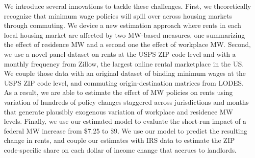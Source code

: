 We introduce several innovations to tackle these challenges.
First, we theoretically recognize that minimum wage policies will spill over across
housing markets through commuting.
We device a new estimation approach where rents in each local housing market are 
affected by two MW-based measures, one summarizing the effect of residence MW and 
a second one the effect of workplace MW.
Second, we use a novel panel dataset on rents at the USPS ZIP code level and with a
monthly frequency from Zillow, the largest online rental marketplace in the US.
We couple those data with an original dataset of binding minimum wages at the USPS
ZIP code level, and commuting origin-destination matrices from LODES.
As a result, we are able to estimate the effect of MW policies on rents using 
variation of hundreds of policy changes staggered across jurisdictions and months 
that generate plausibly exogenous variation of workplace and residence MW levels.
Finally, we use our estimated model to evaluate the short-run impact of a federal 
MW increase from \$7.25 to \$9.
We use our model to predict the resulting change in rents, and couple our estimates
with IRS data to estimate the ZIP code-specific share on each dollar of income change
that accrues to landlords.


